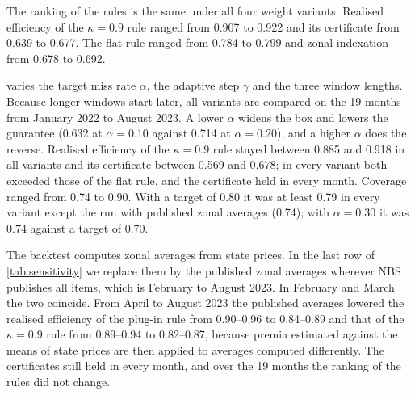 \documentclass[preprint,12pt,number]{elsarticle}%
\theoremstyle{definition}
\theoremstyle{remark}
\begin{document}
The ranking of the rules is the same under all four weight variants. Realised efficiency of the $\kappa=0.9$ rule ranged from 0.907 to 0.922 and its certificate from 0.639 to 0.677. The flat rule ranged from 0.784 to 0.799 and zonal indexation from 0.678 to 0.692.

 varies the target miss rate $\alpha$, the adaptive step $\gamma$ and the three window lengths. Because longer windows start later, all variants are compared on the 19 months from January 2022 to August 2023. A lower $\alpha$ widens the box and lowers the guarantee (0.632 at $\alpha=0.10$ against 0.714 at $\alpha=0.20$), and a higher $\alpha$ does the reverse. Realised efficiency of the $\kappa=0.9$ rule stayed between 0.885 and 0.918 in all variants and its certificate between 0.569 and 0.678; in every variant both exceeded those of the flat rule, and the certificate held in every month. Coverage ranged from 0.74 to 0.90. With a target of 0.80 it was at least 0.79 in every variant except the run with published zonal averages (0.74); with $\alpha=0.30$ it was 0.74 against a target of 0.70.

The backtest computes zonal averages from state prices. In the last row of \cref{tab:sensitivity} we replace them by the published zonal averages wherever NBS publishes all items, which is February to August 2023. In February and March the two coincide. From April to August 2023 the published averages lowered the realised efficiency of the plug-in rule from 0.90--0.96 to 0.84--0.89 and that of the $\kappa=0.9$ rule from 0.89--0.94 to 0.82--0.87, because premia estimated against the means of state prices are then applied to averages computed differently. The certificates still held in every month, and over the 19 months the ranking of the rules did not change.
\end{document}
